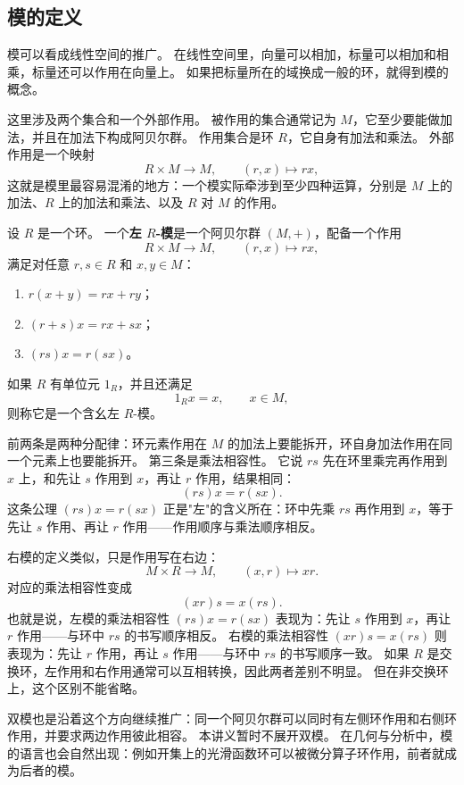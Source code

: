 \subsection{模的定义}\label{sec:module-definition}

模可以看成线性空间的推广。
在线性空间里，向量可以相加，标量可以相加和相乘，标量还可以作用在向量上。
如果把标量所在的域换成一般的环，就得到模的概念。

这里涉及两个集合和一个外部作用。
被作用的集合通常记为 $M$，它至少要能做加法，并且在加法下构成阿贝尔群。
作用集合是环 $R$，它自身有加法和乘法。
外部作用是一个映射
\[
R\times M\to M,\qquad (r,x)\mapsto rx,
\]
这就是模里最容易混淆的地方：一个模实际牵涉到至少四种运算，分别是 $M$ 上的加法、$R$ 上的加法和乘法、以及 $R$ 对 $M$ 的作用。

\begin{definition}[左模]\label{def:left-module}
设 $R$ 是一个环。
一个\textbf{左 $R$-模}是一个阿贝尔群 $(M,+)$，配备一个作用
\[
R\times M\to M,\qquad (r,x)\mapsto rx,
\]
满足对任意 $r,s\in R$ 和 $x,y\in M$：
\begin{enumerate}
    \item $r(x+y)=rx+ry$；
    \item $(r+s)x=rx+sx$；
    \item $(rs)x=r(sx)$。
\end{enumerate}
如果 $R$ 有单位元 $1_R$，并且还满足
\[
1_Rx=x,\qquad x\in M,
\]
则称它是一个含幺左 $R$-模。
\end{definition}

前两条是两种分配律：环元素作用在 $M$ 的加法上要能拆开，环自身加法作用在同一个元素上也要能拆开。
第三条是乘法相容性。
它说 $rs$ 先在环里乘完再作用到 $x$ 上，和先让 $s$ 作用到 $x$，再让 $r$ 作用，结果相同：
\[
(rs)x=r(sx).
\]
这条公理 $(rs)x = r(sx)$ 正是"左"的含义所在：环中先乘 $rs$ 再作用到 $x$，等于先让 $s$ 作用、再让 $r$ 作用——作用顺序与乘法顺序相反。

右模的定义类似，只是作用写在右边：
\[
M\times R\to M,\qquad (x,r)\mapsto xr.
\]
对应的乘法相容性变成
\[
(xr)s=x(rs).
\]
也就是说，左模的乘法相容性 $(rs)x = r(sx)$ 表现为：先让 $s$ 作用到 $x$，再让 $r$ 作用——与环中 $rs$ 的书写顺序相反。
右模的乘法相容性 $(xr)s = x(rs)$ 则表现为：先让 $r$ 作用，再让 $s$ 作用——与环中 $rs$ 的书写顺序一致。
如果 $R$ 是交换环，左作用和右作用通常可以互相转换，因此两者差别不明显。
但在非交换环上，这个区别不能省略。

双模也是沿着这个方向继续推广：同一个阿贝尔群可以同时有左侧环作用和右侧环作用，并要求两边作用彼此相容。
本讲义暂时不展开双模。
在几何与分析中，模的语言也会自然出现：例如开集上的光滑函数环可以被微分算子环作用，前者就成为后者的模。

